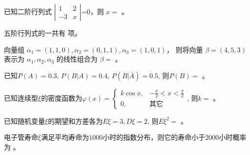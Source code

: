 \documentclass{USTBExam}
\begin{document}
\renewcommand{\niandu}{2017--2018}
\renewcommand{\xueqi}{二}
\renewcommand{\kecheng}{微积分AII}
\renewcommand{\shijuan}{A}
\setcounter{TotalPart}{4}

\makehead


\begin{problem}
已知二阶行列式 $\text{$\left|\begin{array}{cc}
  1 & 2\\
  - 3 & x
\end{array}\right|$=0}$，则 $x=$ 。
\end{problem}


\begin{problem}
五阶行列式的一共有  项。
\end{problem}


\begin{problem}
向量组 $\alpha_1=(1,1,0), \alpha_2=(0,1,1), \alpha_3=(1,0,1)$，
则将向量 $\beta=(4, 5, 3)$ 表示为 $\alpha_1, \alpha_2, \alpha_3$
的线性组合为 $\beta=$ 。
\end{problem}


\begin{problem}
已知$P(A)=0.3$, $P(B|A)=0.4$, $P(B|\bar{A})=0.5$, 则$P(B)=$ 。
\end{problem}


\begin{problem}
已知连续型$\xi$的密度函数为$\varphi(x)=\left\{
\begin{array}{ll}
  k \cos x, & - \frac{\pi}{2} < x < \frac{\pi}{2}\\
  0, & \text{其它}
\end{array}\right.$,
则$k=$ 。
\end{problem}


\begin{problem}
已知随机变量$\xi$的期望和方差各为$E\xi=3, D\xi=2$, 则$E\xi^2=$ 。
\end{problem}


\begin{problem}
电子管寿命$\xi$满足平均寿命为$1000$小时的指数分布，则它的寿命小于$2000$小时概率为 。
\end{problem}
\end{document}
